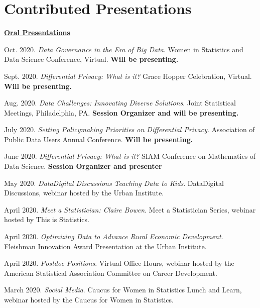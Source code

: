 \documentclass[11pt, letterpaper, roman]{moderncv} %
\begin{document}
\vspace{-10pt}
\section{Contributed Presentations}

\underline{\textbf{\large Oral Presentations}}\normalsize
\begin{etaremune}[topsep=0pt, itemsep=6pt, partopsep=0pt, parsep=0pt]
  \item Oct. 2020. \textit{Data Governance in the Era of Big Data}. Women in Statistics and Data Science Conference, Virtual. \textbf{Will be presenting.}

  \item Sept. 2020. \textit{Differential Privacy: What is it?} Grace Hopper Celebration, Virtual. \textbf{Will be presenting.}

  \item Aug. 2020. \textit{Data Challenges: Innovating Diverse Solutions}. Joint Statistical Meetings, Philadelphia, PA. \textbf{Session Organizer and will be presenting.}
  
  \item July 2020. \textit{Setting Policymaking Priorities on Differential Privacy}. Association of Public Data Users Annual Conference. \textbf{Will be presenting.}

  \item June 2020. \textit{Differential Privacy: What is it?} SIAM Conference on Mathematics of Data Science. \textbf{Session Organizer and presenter}
  
    \item May 2020. \textit{Data\@Urban Digital Discussions Teaching Data to Kids}. Data\@Urban Digital Discussions, webinar hosted by the Urban Institute.
  
  \item April 2020. \textit{Meet a Statistician: Claire Bowen}. Meet a Statistician Series, webinar hosted by This is Statistics.
  
  \item April 2020. \textit{Optimizing Data to Advance Rural Economic Development}. Fleishman Innovation Award Presentation at the Urban Institute.
  
  \item April 2020. \textit{Postdoc Positions}. Virtual Office Hours, webinar hosted by the American Statistical Association Committee on Career Development.
  
  \item March 2020. \textit{Social Media}. Caucus for Women in Statistics Lunch and Learn, webinar hosted by the Caucus for Women in Statistics.


\end{etaremune}
\end{document}
